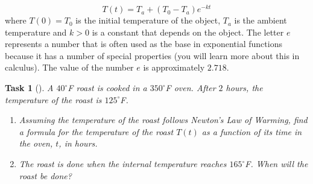 \documentclass[10pt,]{article}
\theoremstyle{plain}
\newtheorem{proposition}[theorem]{Task}
\theoremstyle{definition}
\numberwithin{equation}{section}
\newcommand{\gt}{>}
\begin{document}
\begin{equation*}
T(t)=T_a+(T_0 −T_a)e^{−kt}
\end{equation*}
where \(T(0) = T_0\) is the initial temperature of the object, \(T_a\) is the ambient temperature and \(k \gt 0\) is a constant that depends on the object. The letter \(e\) represents a number that is often used as the base in exponential functions because it has a number of special properties (you will learn more about this in calculus). The value of the number \(e\) is approximately \(2.718\).%
\begin{proposition}[{}]\label{proposition-20}
\hypertarget{p-75}{}%
A \(40^{\circ}\)F roast is cooked in a \(350^{\circ}\)F oven. After \(2\) hours, the temperature of the roast is \(125^{\circ}\)F.%
\leavevmode%
\begin{enumerate}
\item\hypertarget{li-132}{}Assuming the temperature of the roast follows Newton’s Law of Warming, find a formula for the temperature of the roast \(T(t)\) as a function of its time in the oven, \(t\), in hours.%
\item\hypertarget{li-133}{}The roast is done when the internal temperature reaches \(165^{\circ}\)F. When will the roast be done?%
\end{enumerate}
\end{proposition}
\typeout{************************************************}
\typeout{************************************************}
\end{document}
